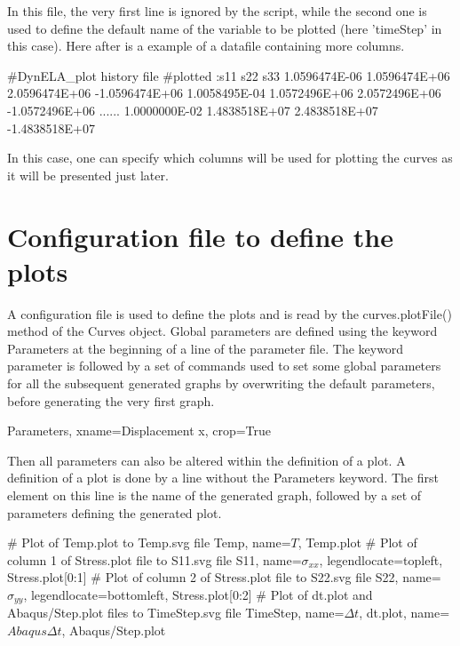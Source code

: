 In this file, the very first line is ignored by the script, while
the second one is used to define the default name of the variable
to be plotted (here 'timeStep' in this case). Here after is a example
of a datafile containing more columns.

\begin{PythonListing}
#DynELA_plot history file
#plotted :s11 s22 s33 
1.0596474E-06 1.0596474E+06 2.0596474E+06 -1.0596474E+06 
1.0058495E-04 1.0572496E+06 2.0572496E+06 -1.0572496E+06 
......
1.0000000E-02 1.4838518E+07 2.4838518E+07 -1.4838518E+07 
\end{PythonListing}

In this case, one can specify which columns will be used for plotting
the curves as it will be presented just later.

\section{Configuration file to define the plots}

A configuration file is used to define the plots and is read by the
\textsf{curves.plotFile()} method of the Curves object. Global parameters
are defined using the keyword \textsf{Parameters} at the beginning
of a line of the parameter file. The keyword parameter is followed
by a set of commands used to set some global parameters for all the
subsequent generated graphs by overwriting the default parameters,
before generating the very first graph.

\begin{PythonListing}
Parameters, xname=Displacement x, crop=True
\end{PythonListing}

Then all parameters can also be altered within the definition of a
plot. A definition of a plot is done by a line without the \textsf{Parameters}
keyword. The first element on this line is the name of the generated
graph, followed by a set of parameters defining the generated plot.

\begin{PythonListing}
# Plot of Temp.plot to Temp.svg file
Temp, name=$T$, Temp.plot
# Plot of column 1 of Stress.plot file to S11.svg file
S11, name=$\sigma_{xx}$, legendlocate=topleft, Stress.plot[0:1]
# Plot of column 2 of Stress.plot file to S22.svg file
S22, name=$\sigma_{yy}$, legendlocate=bottomleft, Stress.plot[0:2]
# Plot of dt.plot and Abaqus/Step.plot files to TimeStep.svg file
TimeStep, name=$\Delta t$, dt.plot, name=$Abaqus \Delta t$, Abaqus/Step.plot
\end{PythonListing}

